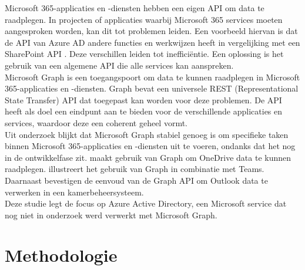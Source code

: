Microsoft 365-applicaties en -diensten hebben een eigen API om data te raadplegen. In projecten of applicaties waarbij  Microsoft 365 services moeten aangesproken worden, kan dit tot problemen leiden. Een voorbeeld hiervan is dat de API van Azure AD andere functies en werkwijzen heeft in vergelijking met een SharePoint API \autocite{VanRousselt2021}. Deze verschillen leiden tot inefficiëntie. Een oplossing is het gebruik van een algemene API die alle services kan aanspreken. \\

Microsoft Graph is een toegangspoort om data te kunnen raadplegen in Microsoft 365-applicaties en -diensten. Graph bevat een universele REST (Representational State Transfer) API dat toegepast kan worden voor deze problemen. De API heeft als doel een eindpunt aan te bieden voor de verschillende applicaties en services, waardoor deze een coherent geheel vormt. \\

Uit onderzoek blijkt dat Microsoft Graph stabiel genoeg is om specifieke taken binnen Microsoft 365-applicaties en -diensten uit te voeren, ondanks dat het nog in de ontwikkelfase zit. \textcite{Hoefling2022} maakt gebruik van Graph om OneDrive data te kunnen raadplegen. \textcite{Jenkins2021} illustreert het gebruik van Graph in combinatie met Teams. Daarnaast bevestigen \textcite{Parsa2019} de eenvoud van de Graph API om Outlook data te verwerken in een kamerbeheersysteem. \\

Deze studie legt de focus op Azure Active Directory, een Microsoft service dat nog niet in onderzoek werd verwerkt met Microsoft Graph. 

\section{Methodologie}%
\label{sec:methodologie}

